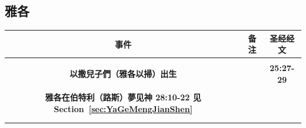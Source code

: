 \subsection{雅各}
\begin{table}[!hbp]
\begin{threeparttable}
\begin{tabular}{c c c}
\toprule
 \multicolumn{1}{L{\dimexpr0.5\linewidth-1\tabcolsep\relax}}{\bfseries 事件} 
&\multicolumn{1}{L{\dimexpr0.2\linewidth-1\tabcolsep\relax}}{\bfseries  备注}   
&\multicolumn{1}{L{\dimexpr0.1\linewidth-1\tabcolsep\relax}}{\bfseries 圣经经文} \\\hline

\multicolumn{1}{L{\dimexpr0.5\linewidth-1\tabcolsep\relax}}{\bfseries }  
& \multicolumn{1}{L{\dimexpr0.2\linewidth-1\tabcolsep\relax}}{\bfseries }
& \multicolumn{1}{L{\dimexpr0.1\linewidth-1\tabcolsep\relax}}{\bfseries }\\ 

\multicolumn{1}{L{\dimexpr0.5\linewidth-1\tabcolsep\relax}}{\bfseries 以撒兒子們（雅各以掃）出生}  
& \multicolumn{1}{L{\dimexpr0.2\linewidth-1\tabcolsep\relax}}{\bfseries }
& \multicolumn{1}{L{\dimexpr0.1\linewidth-1\tabcolsep\relax}}{\bfseries 25:27-29}\\ 

\multicolumn{1}{L{\dimexpr0.5\linewidth-1\tabcolsep\relax}}{\bfseries }  
& \multicolumn{1}{L{\dimexpr0.2\linewidth-1\tabcolsep\relax}}{\bfseries }
& \multicolumn{1}{L{\dimexpr0.1\linewidth-1\tabcolsep\relax}}{\bfseries }\\ 

\multicolumn{1}{L{\dimexpr0.5\linewidth-1\tabcolsep\relax}}{\bfseries 雅各在伯特利（路斯）夢见神 28:10-22 见Section~\ref{sec:YaGeMengJianShen}}  
& \multicolumn{1}{L{\dimexpr0.2\linewidth-1\tabcolsep\relax}}{\bfseries }
& \multicolumn{1}{L{\dimexpr0.1\linewidth-1\tabcolsep\relax}}{\bfseries }\\ 

\multicolumn{1}{L{\dimexpr0.5\linewidth-1\tabcolsep\relax}}{\bfseries }  
& \multicolumn{1}{L{\dimexpr0.2\linewidth-1\tabcolsep\relax}}{\bfseries }
& \multicolumn{1}{L{\dimexpr0.1\linewidth-1\tabcolsep\relax}}{\bfseries }\\ 

\multicolumn{1}{L{\dimexpr0.5\linewidth-1\tabcolsep\relax}}{\bfseries }  
& \multicolumn{1}{L{\dimexpr0.2\linewidth-1\tabcolsep\relax}}{\bfseries }
& \multicolumn{1}{L{\dimexpr0.1\linewidth-1\tabcolsep\relax}}{\bfseries }\\ 


\end{tabular}
\end{threeparttable}
\end{table}

